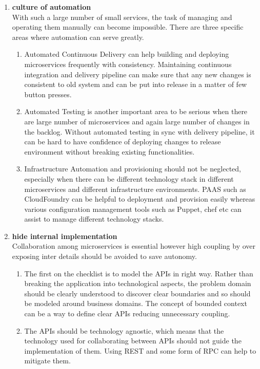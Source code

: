 \begin{enumerate}
\begin{enumerate}
\item \textbf{culture of automation}\\
With such a large number of small services, the task of managing and operating them manually can become impossible. There are three specific areas where automation can serve greatly.
\begin{enumerate}
\item Automated Continuous Delivery can help building and deploying microservices frequently with consistency. Maintaining continuous integration and delivery pipeline can make sure that any new changes is consistent to old system and can be put into release in a matter of few button presses.
\item Automated Testing is another important area to be serious when there are large number of microservices and again large number of changes in the backlog. Without automated testing in sync with delivery pipeline, it can be hard to have confidence of deploying changes to release environment without breaking existing functionalities.
\item Infrastructure Automation and provisioning should not be neglected, especially when there can be different technology stack in different microservices and different infrastructure environments. \acrshort{PAAS} such as CloudFoundry can be helpful to deployment and provision easily whereas various configuration management tools such as Puppet, chef etc can assist to manage different technology stacks.
\end{enumerate}
\item \textbf{hide internal implementation}\\
Collaboration among microservices is essential however high coupling by over exposing inter details should be avoided to save autonomy.
\begin{enumerate}
\item The first on the checklist is to model the \acrshort{API}s in right way. Rather than breaking the application into technological aspects, the problem domain should be clearly understood to discover clear boundaries and so should be modeled around business domains. The concept of bounded context can be a way to define clear \acrshort{API}s reducing unnecessary coupling.
\item The \acrshort{API}s should be technology agnostic, which means that the technology used for collaborating between \acrshort{API}s should not guide the implementation of them. Using \acrshort{REST} and some form of \acrshort{RPC} can help to mitigate them.

\end{enumerate}
\end{enumerate}
\end{enumerate}
